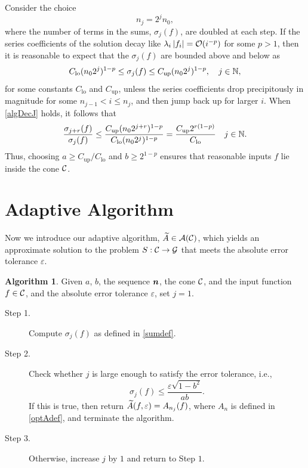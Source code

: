 \documentclass[final]{elsarticle}
\theoremstyle{definition}
\newtheorem{algo}{Algorithm}
\theoremstyle{remark}
\DeclareMathOperator{\up}{up}
\DeclareMathOperator{\lo}{lo}
\newcommand{\optAn}{A_n}
\begin{document}
Consider the choice 
\begin{equation} \label{geonj}
n_j = 2^{j}n_0,
\end{equation}
where the number of terms in the sums, $\sigma_j(f)$, are doubled at each step.  If the series coefficients of the solution decay like $\lambda_{i} \left \lvert f_{i} \right \rvert = \operatorname{{\mathcal O}}(i^{-p})$ for some $p>1$, then it is reasonable to expect that the $\sigma_j(f)$ are bounded above and below as
\begin{equation} \label{algDecJ}
C_{\lo} (n_02^j)^{1-p} \le \sigma_j(f) \le C_{\up} (n_02^j)^{1-p}, \quad   j \in \naturals,
\end{equation}
for some constants $C_{\lo}$ and $C_{\up}$, unless the series coefficients drop precipitously in magnitude for some $n_{j-1} < i \le n_j$, and then jump back up for larger $i$.  When \eqref{algDecJ} holds, it follows that
\begin{equation*} 
\frac{\sigma_{j+r}(f)}{\sigma_j(f)} \le \frac{C_{\up} (n_02^{j+r})^{1-p}}{C_{\lo} (n_02^j)^{1-p}} = \frac{C_{\up} 2^{r(1-p)}}{C_{\lo}}\quad   j \in \naturals.
\end{equation*}
Thus, choosing $a \ge C_{\up}/C_{\lo}$ and $b \ge 2^{1-p}$ ensures that reasonable inputs $f$ lie inside the cone $\mathcal{C}$.


\section{Adaptive Algorithm} \label{sec:adaptalgo}

Now we introduce our adaptive algorithm, $\widetilde{A} \in \mathcal{A}(\mathcal{C})$, which yields an approximate solution to the problem $S:\mathcal{C}\rightarrow\mathcal{G}$ that meets the absolute error tolerance $\varepsilon$.

\begin{algo}\label{algo2}
Given $a$, $b$, the sequence $\boldsymbol{n}$, the cone $\mathcal{C}$, and the input function $f \in \mathcal{C}$, and the absolute error tolerance $\varepsilon$, set $j=1$.
\begin{description}
\item[Step 1.] Compute $\sigma_{j}(f)$ as defined in \eqref{sumdef}.
\item[Step 2.] Check whether $j$ is large enough to satisfy the error tolerance, i.e.,
    \begin{equation}\label{covcrit}
          \sigma_{j}(f) \le \frac{\varepsilon\sqrt{1 - b^2}}{ab} .
    \end{equation}
    If this is true, then return $\widetilde{A}(f,\varepsilon) = A_{n_{j}}(f)$, where $\optAn$ is defined in \eqref{optAdef}, and terminate the algorithm.
\item[Step 3.] Otherwise, increase $j$ by $1$ and return to Step $1$.
\end{description}
\end{algo}
\end{document}
